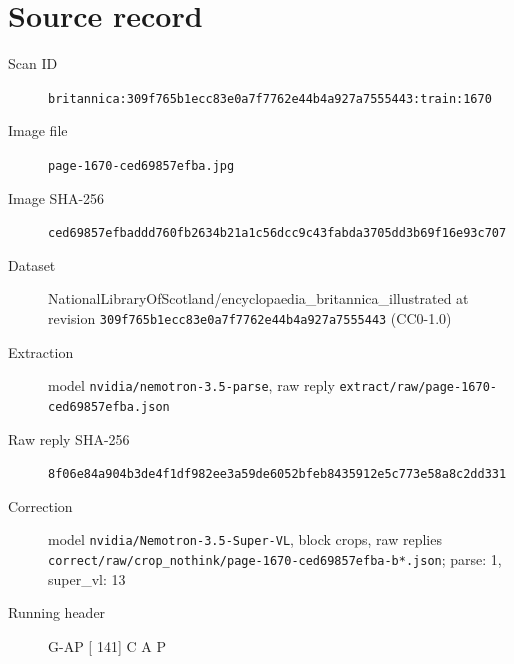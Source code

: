 \documentclass{article}
\begin{document}
\section*{Source record}
\begin{description}
\item[Scan ID] \texttt{britannica:309f765b1ecc83e0a7f7762e44b4a927a7555443:train:1670}
\item[Image file] \texttt{page-1670-ced69857efba.jpg}
\item[Image SHA-256] \texttt{ced69857efbaddd760fb2634b21a1c56dcc9c43fabda3705dd3b69f16e93c707}
\item[Dataset] NationalLibraryOfScotland/encyclopaedia\_britannica\_illustrated at revision \texttt{309f765b1ecc83e0a7f7762e44b4a927a7555443} (CC0-1.0)
\item[Extraction] model \texttt{nvidia/nemotron-3.5-parse}, raw reply \texttt{extract/raw/page-1670-ced69857efba.json}
\item[Raw reply SHA-256] \texttt{8f06e84a904b3de4f1df982ee3a59de6052bfeb8435912e5c773e58a8c2dd331}
\item[Correction] model \texttt{nvidia/Nemotron-3.5-Super-VL}, block crops, raw replies \texttt{correct/raw/crop\_nothink/page-1670-ced69857efba-b*.json}; parse: 1, super\_vl: 13
\item[Running header] G-AP [ 141] C A P
\end{description}
\end{document}
